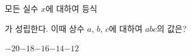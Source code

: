 모든 실수 $x$에 대하여 등식\par\smallskip{}\par\smallskip\noindent 가 성립한다. 이때 상수 $a$, $b$, $c$에 대하여 $abc$의 값은?
\begin{choices32}{$-20$}{$-18$}{$-16$}{$-14$}{$-12$}\end{choices32}
